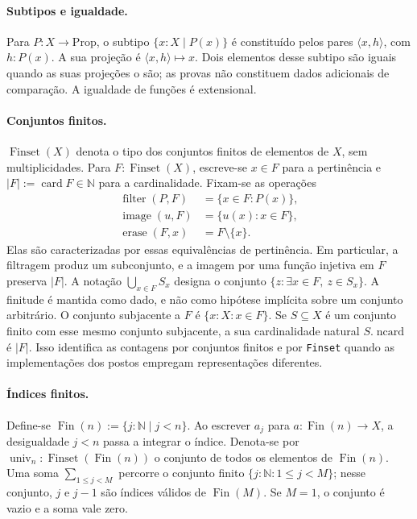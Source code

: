 \documentclass[12pt,a4paper]{article}
\theoremstyle{preciso}
\theoremstyle{definition}
\newcommand{\N}{\mathbb N}
\newcommand{\Fin}{\operatorname{Fin}}
\newcommand{\FS}{\operatorname{Finset}}
\newcommand{\card}{\operatorname{card}}
\newcommand{\code}[1]{\nolinkurl{#1}}
\theoremstyle{preciso}
\theoremstyle{preciso}
\theoremstyle{preciso}
\theoremstyle{preciso}
\theoremstyle{definition}
\theoremstyle{preciso}
\theoremstyle{definition}
\theoremstyle{preciso}
\theoremstyle{preciso}
\theoremstyle{definition}
\begin{document}
\paragraph{Subtipos e igualdade.}
Para $P:X\to\mathrm{Prop}$, o subtipo
$\{x:X\mid P(x)\}$ é constituído pelos pares $\langle x,h\rangle$, com $h:P(x)$.
A sua projeção é $\langle x,h\rangle\mapsto x$. Dois elementos desse subtipo
são iguais quando as suas projeções o são; as provas não constituem
dados adicionais de comparação. A igualdade de funções é extensional.

\paragraph{Conjuntos finitos.}
$\FS(X)$ denota o tipo dos conjuntos finitos de elementos de $X$, sem
multiplicidades. Para $F:\FS(X)$, escreve-se $x\in F$ para a pertinência e
$|F|:=\card F\in\N$ para a cardinalidade. Fixam-se as operações
\begin{align*}
 \operatorname{filter}(P,F)&=\{x\in F:P(x)\},\\
 \operatorname{image}(u,F)&=\{u(x):x\in F\},\\
 \operatorname{erase}(F,x)&=F\setminus\{x\}.
\end{align*}
Elas são caracterizadas por essas equivalências de pertinência. Em
particular, a filtragem produz um subconjunto, e a imagem por uma função
injetiva em $F$ preserva $|F|$. A notação $\bigcup_{x\in F}S_x$ designa o
conjunto $\{z:\exists x\in F,\ z\in S_x\}$. A finitude é mantida como dado,
e não como hipótese implícita sobre um conjunto arbitrário.
O conjunto subjacente a $F$ é $\{x:X:x\in F\}$.
Se $S\subseteq X$ é um conjunto finito com esse mesmo conjunto
subjacente, a sua cardinalidade natural $S.\operatorname{ncard}$ é $|F|$.
Isso identifica as contagens por conjuntos finitos e por \code{Finset}
quando as implementações dos postos empregam representações diferentes.

\paragraph{Índices finitos.}
Define-se $\Fin(n):=\{j:\N\mid j<n\}$. Ao escrever $a_j$ para
$a:\Fin(n)\to X$, a desigualdade $j<n$ passa a integrar o índice.
Denota-se por $\operatorname{univ}_n:\FS(\Fin(n))$ o conjunto de todos
os elementos de $\Fin(n)$. Uma soma $\sum_{1\le j<M}$ percorre o conjunto finito
$\{j:\N:1\le j<M\}$; nesse conjunto, $j$ e $j-1$ são índices válidos de
$\Fin(M)$. Se $M=1$, o conjunto é vazio e a soma vale zero.
\end{document}
